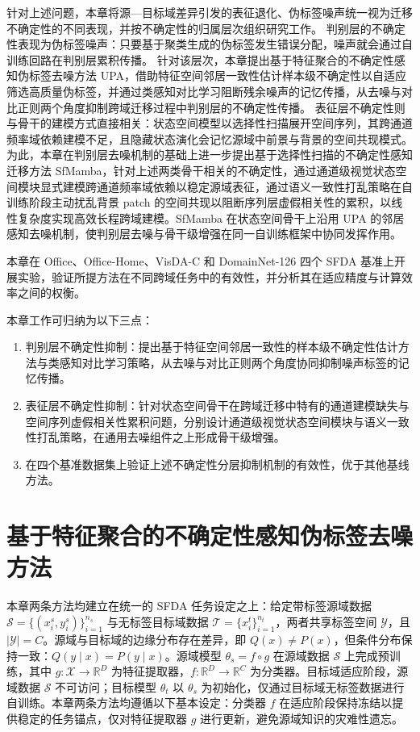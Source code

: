 针对上述问题，本章将源—目标域差异引发的表征退化、伪标签噪声统一视为迁移不确定性的不同表现，并按不确定性的归属层次组织研究工作。
判别层的不确定性表现为伪标签噪声：只要基于聚类生成的伪标签发生错误分配，噪声就会通过自训练回路在判别层累积传播。
针对该层次，本章提出基于特征聚合的不确定性感知伪标签去噪方法 UPA，借助特征空间邻居一致性估计样本级不确定性以自适应筛选高质量伪标签，并通过类感知对比学习阻断残余噪声的记忆传播，从去噪与对比正则两个角度抑制跨域迁移过程中判别层的不确定性传播。
表征层不确定性则与骨干的建模方式直接相关：状态空间模型以选择性扫描展开空间序列，其跨通道频率域依赖建模不足，且隐藏状态演化会记忆源域中前景与背景的空间共现模式。为此，本章在判别层去噪机制的基础上进一步提出基于选择性扫描的不确定性感知迁移方法 SfMamba，针对上述两类骨干相关的不确定性，通过通道级视觉状态空间模块显式建模跨通道频率域依赖以稳定源域表征，通过语义一致性打乱策略在自训练阶段主动扰乱背景 patch 的空间共现以阻断序列层虚假相关性的累积，以线性复杂度实现高效长程跨域建模。SfMamba 在状态空间骨干上沿用 UPA 的邻居感知去噪机制，使判别层去噪与骨干级增强在同一自训练框架中协同发挥作用。

本章在 Office、Office-Home、VisDA-C 和 DomainNet-126 四个 SFDA 基准上开展实验，验证所提方法在不同跨域任务中的有效性，并分析其在适应精度与计算效率之间的权衡。

本章工作可归纳为以下三点：
\begin{enumerate}
    \item 判别层不确定性抑制：提出基于特征空间邻居一致性的样本级不确定性估计方法与类感知对比学习策略，从去噪与对比正则两个角度协同抑制噪声标签的记忆传播。
    \item 表征层不确定性抑制：针对状态空间骨干在跨域迁移中特有的通道建模缺失与空间序列虚假相关性累积问题，分别设计通道级视觉状态空间模块与语义一致性打乱策略，在通用去噪组件之上形成骨干级增强。
    \item 在四个基准数据集上验证上述不确定性分层抑制机制的有效性，优于其他基线方法。
\end{enumerate}

\section{基于特征聚合的不确定性感知伪标签去噪方法}

\label{sec:chap2_upa}

本章两条方法均建立在统一的 SFDA 任务设定之上：给定带标签源域数据 $\mathcal{S} = \{(x_i^s, y_i^s)\}_{i=1}^{n_s}$ 与无标签目标域数据 $\mathcal{T} = \{x_i^t\}_{i=1}^{n_t}$，两者共享标签空间 $\mathcal{Y}$，且 $|\mathcal{Y}| = C$。源域与目标域的边缘分布存在差异，即 $Q(x) \neq P(x)$，但条件分布保持一致：$Q(y \mid x) = P(y \mid x)$。源域模型 $\theta_s = f \circ g$ 在源域数据 $\mathcal{S}$ 上完成预训练，其中 $g: \mathcal{X} \to \mathbb{R}^D$ 为特征提取器，$f: \mathbb{R}^D \to \mathbb{R}^C$ 为分类器。目标域适应阶段，源域数据 $\mathcal{S}$ 不可访问；目标模型 $\theta_t$ 以 $\theta_s$ 为初始化，仅通过目标域无标签数据进行自训练。本章两条方法均遵循以下基本设定：分类器 $f$ 在适应阶段保持冻结以提供稳定的任务锚点，仅对特征提取器 $g$ 进行更新，避免源域知识的灾难性遗忘。

